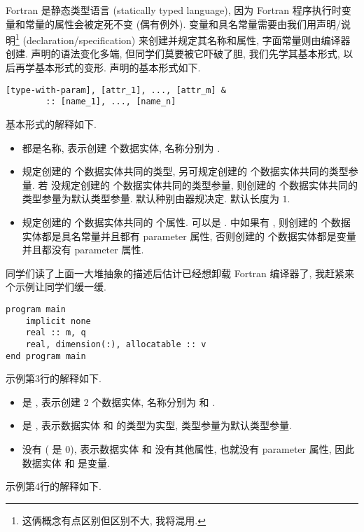 Fortran 是静态类型语言 (statically typed language), 因为 Fortran 程序执行时变量和常量的属性会被定死不变 (偶有例外). 变量和具名常量需要由我们用声明/说明\footnote{这俩概念有点区别但区别不大, 我将混用.} (declaration/specification) 来创建并规定其名称和属性, 字面常量则由编译器创建. 声明的语法变化多端, 但同学们莫要被它吓破了胆, 我们先学其基本形式, 以后再学基本形式的变形. 声明的基本形式如下.
\begin{lstlisting}[numbers=none]
    [type-with-param], [attr_1], ..., [attr_m] &
        :: [name_1], ..., [name_n]
\end{lstlisting}
基本形式的解释如下.
\begin{itemize}
    \item {} 都是名称, 表示创建  个数据实体, 名称分别为 .
    \item {} 规定创建的  个数据实体共同的类型, 另可规定创建的  个数据实体共同的类型参量. 若  没规定创建的  个数据实体共同的类型参量, 则创建的  个数据实体共同的类型参量为默认类型参量. 默认种别由器规决定. 默认长度为 $1$.
    \item {} 规定创建的  个数据实体共同的  个属性.  可以是 .  中如果有 , 则创建的  个数据实体都是具名常量并且都有 parameter 属性, 否则创建的  个数据实体都是变量并且都没有 parameter 属性.
\end{itemize}
同学们读了上面一大堆抽象的描述后估计已经想卸载 Fortran 编译器了, 我赶紧来个示例让同学们缓一缓. 
\begin{lstlisting}
program main
    implicit none
    real :: m, q
    real, dimension(:), allocatable :: v
end program main
\end{lstlisting}
示例第3行的解释如下.
\begin{itemize}
    \item {} 是 , 表示创建 2 个数据实体, 名称分别为  和 .
    \item {} 是 , 表示数据实体  和  的类型为实型, 类型参量为默认类型参量.
    \item {} 没有 ( 是 0), 表示数据实体  和  没有其他属性, 也就没有 parameter 属性, 因此数据实体  和 是变量.
\end{itemize}
示例第4行的解释如下.
